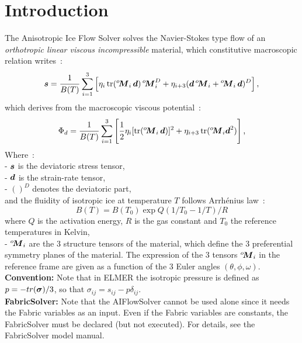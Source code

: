 \section{Introduction}
The Anisotropic Ice Flow Solver solves the Navier-Stokes type flow of an \textit{orthotropic linear viscous
incompressible } material, which constitutive macroscopic relation writes~:
\begin{equation} \label{polylawinv}
\Mat{s} = \sur{1}{{B}(T)} \sum_{i=1}^3 \left[ {\eta}_i \tr(\Matg{M}{o}_i \,\Mat{d}) \, \Matg{M}{o}_i^D + {\eta}_{i+3} (
\Mat{d} \, \Matg{M}{o}_i + \Matg{M}{o}_i \, \Mat{d})^D \right] \textrm{,}
\end{equation}
which derives from the macroscopic viscous potential~:
\begin{equation}
{\Phi}_d =  \sur{1}{{B}(T)} \sum_{i=1}^3 \left[ \sur{1}{2} {\eta}_i [\tr(\Matg{M}{o}_i \,\Mat{d})]^2  + {\eta}_{i+3}
\tr(\Matg{M}{o}_i \Mat{d}^2)\right] \textrm{,}
\end{equation}
%
Where~:\\
- $\Mat{s}$ is the deviatoric stress tensor,\\
%
- $\Mat{d}$ is the strain-rate tensor,\\
%
- $()^D$ denotes the deviatoric part,\\
%
and the fluidity of isotropic ice at temperature $T$ follows Arrh\'{e}nius law~:
\begin{equation} {B}(T) = {B} (T_0) \exp{{Q}({1}/{T_0}-{1}/{T})/R}
\end{equation}
 where
$Q$ is the activation energy, $R$ is the gas constant and  $T_0$ the reference temperatures in Kelvin,\\
%
- $\Matg{M}{o}_i$ are the 3 structure tensors of the material, which define the 3 preferential symmetry planes of the
material. The expression of the 3 tensors $\Matg{M}{o}_i$ in the reference frame are given as a function of the 3 Euler
angles $(\theta,\phi,\omega)$.\\

\noindent \textbf{Convention:} Note that in ELMER the isotropic pressure is defined as $p = - tr (\Mat{\sigma}) /3 $,
so that $\sigma_{ij} = s_{ij} - p \delta_{ij}$. \\

\noindent \textbf{FabricSolver:} Note that the AIFlowSolver cannot be used alone since it needs the Fabric variables as
an input. Even if the Fabric variables are constants, the FabricSolver must be declared (but not executed). For
details, see the FabricSolver model manual.\\

